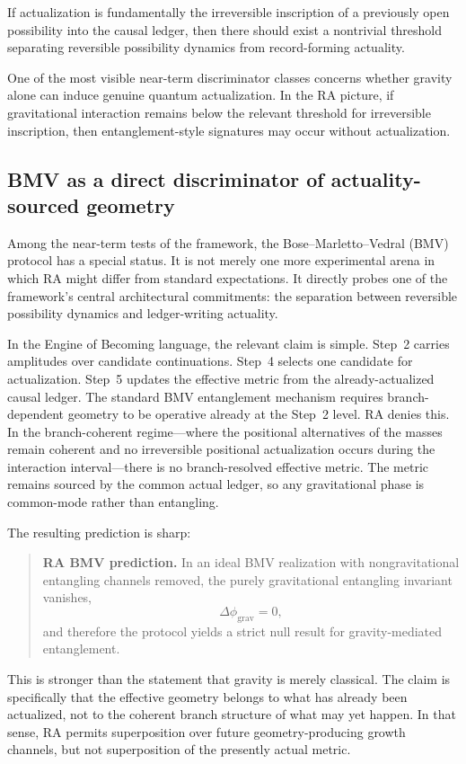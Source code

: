 \documentclass[11pt]{article}
\begin{document}
If actualization is fundamentally the irreversible inscription of a previously open possibility into the causal ledger, then there should exist a nontrivial threshold separating reversible possibility dynamics from record-forming actuality.

One of the most visible near-term discriminator classes concerns whether gravity alone can induce genuine quantum actualization. In the RA picture, if gravitational interaction remains below the relevant threshold for irreversible inscription, then entanglement-style signatures may occur without actualization.

\subsection{BMV as a direct discriminator of actuality-sourced geometry}

Among the near-term tests of the framework, the Bose--Marletto--Vedral (BMV) protocol has a special status. It is not merely one more experimental arena in which RA might differ from standard expectations. It directly probes one of the framework's central architectural commitments: the separation between reversible possibility dynamics and ledger-writing actuality.

In the Engine of Becoming language, the relevant claim is simple. Step~2 carries amplitudes over candidate continuations. Step~4 selects one candidate for actualization. Step~5 updates the effective metric from the already-actualized causal ledger. The standard BMV entanglement mechanism requires branch-dependent geometry to be operative already at the Step~2 level. RA denies this. In the branch-coherent regime---where the positional alternatives of the masses remain coherent and no irreversible positional actualization occurs during the interaction interval---there is no branch-resolved effective metric. The metric remains sourced by the common actual ledger, so any gravitational phase is common-mode rather than entangling.

The resulting prediction is sharp:
\begin{quote}
\textbf{RA BMV prediction.} In an ideal BMV realization with nongravitational entangling channels removed, the purely gravitational entangling invariant vanishes,
\[
\Delta \phi_{\mathrm{grav}} = 0,
\]
and therefore the protocol yields a strict null result for gravity-mediated entanglement.
\end{quote}

This is stronger than the statement that gravity is merely classical. The claim is specifically that the effective geometry belongs to what has already been actualized, not to the coherent branch structure of what may yet happen. In that sense, RA permits superposition over future geometry-producing growth channels, but not superposition of the presently actual metric.
\end{document}
